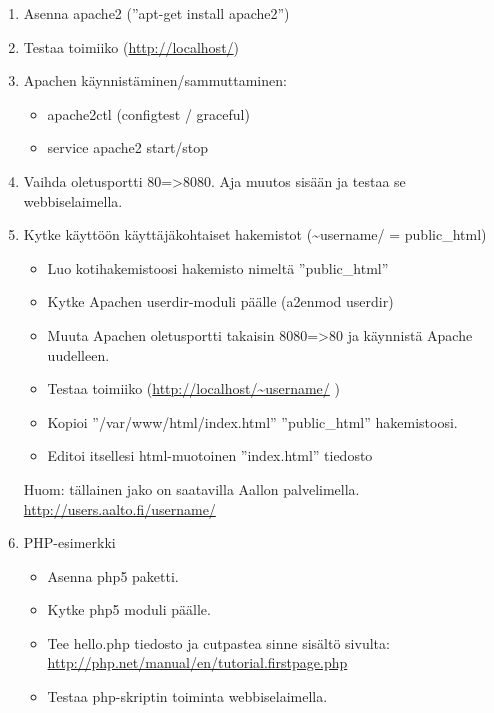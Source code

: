 \documentclass[12pt,portrait,a4]{article}
\begin{document}
\begin{enumerate}
\item Asenna apache2 (''apt-get install apache2'')
\item Testaa toimiiko (\url{http://localhost/})
\item Apachen käynnistäminen/sammuttaminen:
	\begin{itemize}
	\item apache2ctl (configtest / graceful)
	\item service apache2 start/stop
	\end{itemize}
\item Vaihda oletusportti 80=\textgreater 8080.  Aja muutos sisään ja testaa se webbiselaimella.
\item Kytke käyttöön käyttäjäkohtaiset hakemistot (\textasciitilde username/ = public\_html)
	\begin{itemize}
	\item Luo kotihakemistoosi hakemisto nimeltä ''public\_html''
	\item Kytke Apachen userdir-moduli päälle (a2enmod userdir)
	\item Muuta Apachen oletusportti takaisin 8080=\textgreater 80 ja käynnistä Apache uudelleen.
	\item Testaa toimiiko (\url{http://localhost/~username/} )
	\item Kopioi ''/var/www/html/index.html'' ''public\_html'' hakemistoosi.
	\item Editoi itsellesi html-muotoinen ''index.html'' tiedosto
	\end{itemize}

Huom: tällainen jako on saatavilla Aallon palvelimella.
\url{http://users.aalto.fi/username/}


\item PHP-esimerkki
	\begin{itemize}
	\item Asenna php5 paketti.
	\item Kytke php5 moduli päälle.
	\item Tee hello.php tiedosto ja cutpastea sinne sisältö sivulta:
\url{http://php.net/manual/en/tutorial.firstpage.php}
	\item Testaa php-skriptin toiminta webbiselaimella.
	\end{itemize}
\end{enumerate}
\end{document}
